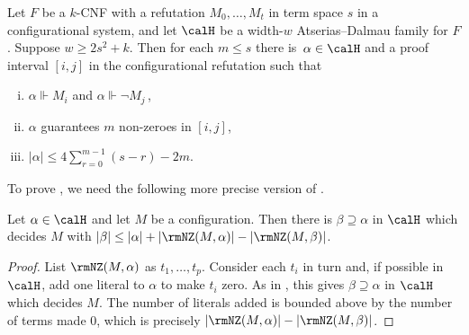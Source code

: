 \begin{lemma}\label{lem:main-prime}
Let $F$ be a $k$-CNF with a refutation $M_0,\ldots,M_t$ in term space $s$ 
in a configurational system,
and let $\calH$ be a width-$w$ Atserias--Dalmau family for $F$.
Suppose $w \ge 2s^2+k$.
Then for each $m \le s$ there is~$\alpha \in \calH$ 
and a proof interval $[i,j]$ in the configurational refutation such that
\begin{enumerate}[(i)]
\item 
$\alpha \Vdash M_{i}$ and  $\alpha \Vdash \neg M_{j}$\,,
\item 
$\alpha$ guarantees $m$ non-zeroes in $[i,j]$,
\item 
$|\alpha| \le 4 \sum_{r=0}^{m-1} (s-r) -2m$.
\end{enumerate}
\end{lemma}

To prove ,  
we need the following more precise version of .

\begin{lemma} \label{lem:extend_NZ}
Let $\alpha \in \calH$ and let $M$ be a configuration. 
Then there is $\beta \supseteq \alpha$ in $\calH$ 
which decides $M$ with
$|\beta| \le |\alpha|+|\rmNZ(M,\alpha)|-|\rmNZ(M, \beta)|$.
\end{lemma}

\begin{proof}
List $\rmNZ(M, \alpha)$ as $t_1, \dots, t_p$.
Consider each $t_i$ in turn and, if possible in $\calH$, add one literal to $\alpha$ to make $t_i$ zero.
As in ,
this gives $\beta \supseteq \alpha$ in $\calH$ which decides $M$.
The number of literals added is bounded above by the number
of terms made $0$, which is precisely $|\rmNZ(M,\alpha)|-|\rmNZ(M, \beta)|$. 
\end{proof}

